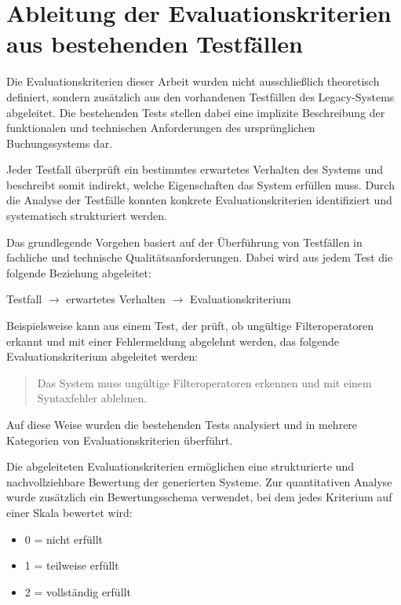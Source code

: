 \section{Ableitung der Evaluationskriterien aus bestehenden Testfällen}

Die Evaluationskriterien dieser Arbeit wurden nicht ausschließlich
theoretisch definiert, sondern zusätzlich aus den vorhandenen
Testfällen des Legacy-Systems abgeleitet. Die bestehenden Tests
stellen dabei eine implizite Beschreibung der funktionalen und
technischen Anforderungen des ursprünglichen Buchungssystems dar.

Jeder Testfall überprüft ein bestimmtes erwartetes Verhalten des
Systems und beschreibt somit indirekt, welche Eigenschaften das
System erfüllen muss. Durch die Analyse der Testfälle konnten
konkrete Evaluationskriterien identifiziert und systematisch
strukturiert werden.

Das grundlegende Vorgehen basiert auf der Überführung von
Testfällen in fachliche und technische Qualitätsanforderungen.
Dabei wird aus jedem Test die folgende Beziehung abgeleitet:

\begin{center}
Testfall $\rightarrow$ erwartetes Verhalten $\rightarrow$
Evaluationskriterium
\end{center}

Beispielsweise kann aus einem Test, der prüft, ob ungültige
Filteroperatoren erkannt und mit einer Fehlermeldung abgelehnt
werden, das folgende Evaluationskriterium abgeleitet werden:

\begin{quote}
Das System muss ungültige Filteroperatoren erkennen und mit
einem Syntaxfehler ablehnen.
\end{quote}

Auf diese Weise wurden die bestehenden Tests analysiert und
in mehrere Kategorien von Evaluationskriterien überführt.

Die abgeleiteten Evaluationskriterien ermöglichen eine strukturierte
und nachvollziehbare Bewertung der generierten Systeme.
Zur quantitativen Analyse wurde zusätzlich ein
Bewertungsschema verwendet, bei dem jedes Kriterium
auf einer Skala bewertet wird:

\begin{itemize}
    \item 0 = nicht erfüllt
    \item 1 = teilweise erfüllt
    \item 2 = vollständig erfüllt
\end{itemize}

